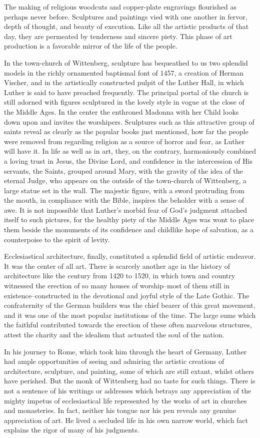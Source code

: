 The making of religious woodcuts and copper-plate engravings
flourished as perhaps never before. Sculptures and paintings vied with
one another in fervor, depth of thought, and beauty of execution.
Like all the artistic products of that day, they are permeated by
tenderness and sincere piety. This phase of art production is a favorable
mirror of the life of the people.

In the town-church of Wittenberg, sculpture has bequeathed to
us two splendid models in the richly ornamented baptismal font
of 1457, a creation of Herman Vischer, and in the artistically constructed
pulpit of the Luther Hall, in which Luther is said to have
preached frequently. The principal portal of the church is still
adorned with figures sculptured in the lovely style in vogue at the
close of the Middle Ages. In the center the enthroned Madonna with
her Child looks down upon and invites the worshipers. Sculptures
such as this attractive group of saints reveal as clearly as the popular
books just mentioned, how far the people were removed from regarding religion
as a source of horror and fear, as Luther will have
it. In life as well as in art, they, on the contrary, harmoniously
combined a loving trust in Jesus, the Divine Lord, and confidence
in the intercession of His servants, the Saints, grouped around Mary,
with the gravity of the idea of the eternal Judge, who appears
on the outside of the town-church of Wittenberg, a large statue set
in the wall. The majestic figure, with a sword protruding from the
mouth, in compliance with the Bible, inspires the beholder with a
sense of awe. It is not impossible that Luther’s morbid fear of God’s
judgment attached itself to such pictures, for the healthy piety of
the Middle Ages was wont to place them beside the monuments of
its confidence and childlike hope of salvation, as a counterpoise to
the spirit of levity.

Ecclesiastical architecture, finally, constituted a splendid field of
artistic endeavor. It was the center of all art. There is scarcely another
age in the history of architecture like the century from 1420
to 1520, in which town and country witnessed the erection of so
many houses of worship--most of them still in existence--constructed in
the devotional and joyful style of the Late Gothic. The
confraternity of the German builders was the chief bearer of this
great movement, and it was one of the most popular institutions
of the time. The large sums which the faithful contributed towards
the erection of these often marvelous structures, attest the charity
and the idealism that actuated the soul of the nation.

In his journey to Rome, which took him through the heart of
Germany, Luther had ample opportunities of seeing and admiring
the artistic creations of architecture, sculpture, and painting, some
of which are still extant, whilst others have perished. But the monk
of Wittenberg had no taste for such things. There is not a sentence
of his writings or addresses which betrays any appreciation of the
mighty impetus of ecclesiastical life represented by the works of art
in churches and monasteries. In fact, neither his tongue nor his pen
reveals any genuine appreciation of art. He lived a secluded life in
his own narrow world, which fact explains the rigor of many of
his judgments.

